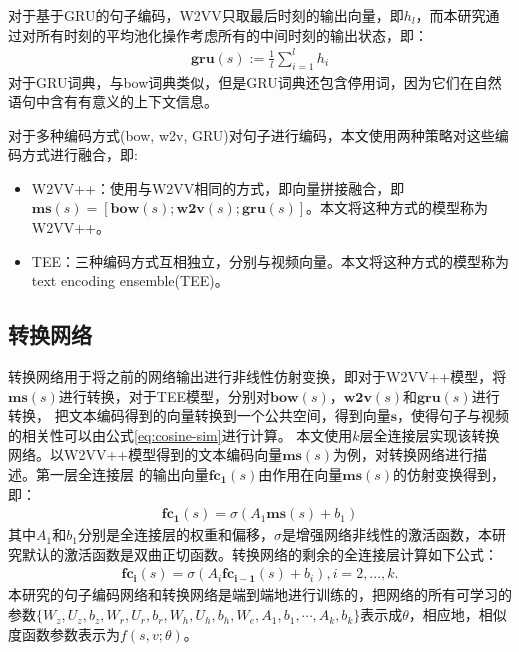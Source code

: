 对于基于GRU的句子编码，W2VV只取最后时刻的输出向量，即$h_l$，而本研究通过对所有时刻的平均池化操作考虑所有的中间时刻的输出状态，即：
\begin{equation}
    \label{eq:gru-mean}
    \begin{aligned}
        \bm{\mathbf{gru}}(s) := \frac{1}{l}\sum^l_{i=1}h_i
    \end{aligned}
\end{equation}
对于GRU词典，与bow词典类似，但是GRU词典还包含停用词，因为它们在自然语句中含有有意义的上下文信息。

对于多种编码方式(bow, w2v, GRU)对句子进行编码，本文使用两种策略对这些编码方式进行融合，即:
\begin{itemize}
    \item W2VV++：使用与W2VV相同的方式，即向量拼接融合，即$\bm{\mathbf{ms}}(s)=[\bm{\mathbf{bow}}(s);\bm{\mathbf{w2v}}(s);\bm{\mathbf{gru}}(s)]$。本文将这种方式的模型称为W2VV++。

    \item TEE：三种编码方式互相独立，分别与视频向量。本文将这种方式的模型称为text encoding ensemble(TEE)。
\end{itemize}

\subsection{转换网络}
转换网络用于将之前的网络输出进行非线性仿射变换，即对于W2VV++模型，将$\bm{\mathbf{ms}}(s)$进行转换，对于TEE模型，分别对$\bm{\mathbf{bow}}(s)$，$\bm{\mathbf{w2v}}(s)$和$\bm{\mathbf{gru}}(s)$进行转换，
把文本编码得到的向量转换到一个公共空间，得到向量$\bm{\mathbf{s}}$，使得句子与视频的相关性可以由公式\ref{eq:cosine-sim}进行计算。
本文使用$k$层全连接层实现该转换网络。以W2VV++模型得到的文本编码向量$\bm{\mathbf{ms}}(s)$为例，对转换网络进行描述。第一层全连接层
的输出向量$\bm{\mathbf{fc_1}}(s)$由作用在向量$\bm{\mathbf{ms}}(s)$的仿射变换得到，即：
\begin{equation}
    \label{eq:fc-1}
    \begin{aligned}
        \bm{\mathbf{fc_1}}(s) = \sigma(A_1\bm{\mathbf{ms}}(s) + b_1)
    \end{aligned}
\end{equation}
其中$A_1$和$b_1$分别是全连接层的权重和偏移，$\sigma$是增强网络非线性的激活函数，本研究默认的激活函数是双曲正切函数。转换网络的剩余的全连接层计算如下公式：
\begin{equation}
    \label{eq:fc-k}
    \begin{aligned}
        \bm{\mathbf{fc_i}}(s) = \sigma(A_i\bm{\mathbf{fc_{i-1}}}(s) + b_i), i=2,...,k.
    \end{aligned}
\end{equation}
本研究的句子编码网络和转换网络是端到端地进行训练的，把网络的所有可学习的参数$\{W_z,U_z,b_z,W_r,U_r,b_r,W_h,U_h,b_h,W_e,A_1,b_1,\cdots,A_k,b_k\}$表示成$\theta$，相应地，相似度函数参数表示为$f(s,v;\theta)$。


